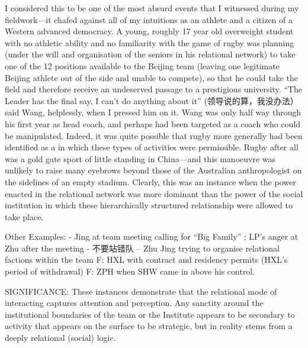 \begin{CJK}{UTF8}{gbsn}
  I considered this to be one of the most absurd events that I witnessed during my fieldwork---it chafed against all of my intuitions as an athlete and a citizen of a Western advanced democracy.  A young, roughly 17 year old overweight student with no athletic ability and no familiarity with the game of rugby was planning (under the will and organisation of the seniors in his relational network) to take one of the 12 positions available to the Beijing team (leaving one legitimate Beijing athlete out of the side and unable to compete), so that he could take the field and therefore receive an undeserved passage to a prestigious university.  ``The Leader has the final say, I can't do anything about it'' (领导说的算，我没办法）said Wang, helplessly, when I pressed him on it.  Wang was only half way through his first year as head coach, and perhaps had been targeted as a coach who could be manipulated.  Indeed, it was quite possible that rugby more generally had been identified as a in which these types of activities were permissible.  Rugby after all was a gold gate sport of little standing in China---and this manoeuvre was unlikely to raise many eyebrows beyond those of the Australian anthropologist on the sidelines of an empty stadium. Clearly, this was an instance when the power enacted in the relational network was more dominant than the power of the social institution in which these hierarchically structured relationship were allowed to take place.

  Other Examples:
  - Jing at team meeting calling for ``Big Family'' ; LP's anger at Zhu after the meeting
  - 不要站错队 -- Zhu Jing trying to organise relational factions within the team
  F: HXL with contract and residency permits (HXL's period of withdrawal)
  F: ZPH when SHW came in above his control.

  SIGNIFICANCE: These instances demonstrate that the relational mode of interacting captures attention and perception. Any sanctity around the institutional boundaries of the team or the Institute appears to be secondary to activity that appears on the surface to be strategic, but in reality stems from a deeply relational (social) logic.





\end{CJK}
